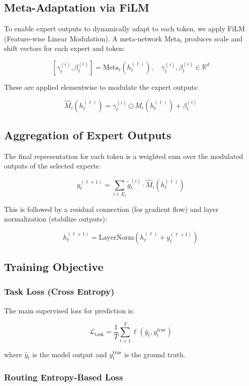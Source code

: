 \documentclass{article}
\begin{document}
\subsection{Meta-Adaptation via FiLM}

To enable expert outputs to dynamically adapt to each token, we apply FiLM (Feature-wise Linear Modulation). A meta-network \( \text{Meta}_i \) produces scale and shift vectors for each expert and token:

\[
[\gamma_t^{(i)}, \beta_t^{(i)}] = \text{Meta}_i(h_t^{(\ell)}), \quad \gamma_t^{(i)}, \beta_t^{(i)} \in \mathbb{R}^d
\]


\noindent
These are applied elementwise to modulate the expert outputs:

\[
\hat{M}_i(h_t^{(\ell)}) = \gamma_t^{(i)} \odot M_i(h_t^{(\ell)}) + \beta_t^{(i)}
\]

\subsection{Aggregation of Expert Outputs}

The final representation for each token is a weighted sum over the modulated outputs of the selected experts:

\[
y_t^{(\ell+1)} = \sum_{i \in E_t} \tilde{g}_t^{(i)} \cdot \hat{M}_i(h_t^{(\ell)})
\]


\noindent
This is followed by a residual connection (for gradient flow) and layer normalization (stabilize outputs):

\[
h_t^{(\ell+1)} = \text{LayerNorm}(h_t^{(\ell)} + y_t^{(\ell+1)})
\]

\subsection{Training Objective}

\subsubsection{Task Loss (Cross Entropy)}

The main supervised loss for prediction is:

\[
\mathcal{L}_{\text{task}} = \frac{1}{T} \sum_{t=1}^{T} \ell(\hat{y}_t, y_t^{\text{true}})
\]

where \( \hat{y}_t \) is the model output and \( y_t^{\text{true}} \) is the ground truth.

\subsubsection{Routing Entropy-Based Loss}
\end{document}
